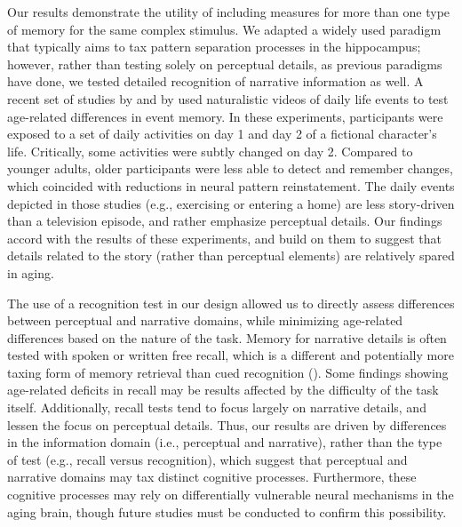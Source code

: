 \documentclass[11pt]{article}
\begin{document}
Our results demonstrate the utility of including measures for more than one type of memory for the same complex stimulus. We adapted a widely used paradigm that typically aims to tax pattern separation processes in the hippocampus; however, rather than testing solely on perceptual details, as previous paradigms have done, we tested detailed recognition of narrative information as well. A recent set of studies by \cite{wahlheim_memory_2019} and by \cite{stawarczyk_aging_2020} used naturalistic videos of daily life events to test age-related differences in event memory. In these experiments, participants were exposed to a set of daily activities on day 1 and day 2 of a fictional character’s life. Critically, some activities were subtly changed on day 2. Compared to younger adults, older participants were less able to detect and remember changes, which coincided with reductions in neural pattern reinstatement. The daily events depicted in those studies (e.g., exercising or entering a home) are less story-driven than a television episode, and rather emphasize perceptual details. Our findings accord with the results of these experiments, and build on them to suggest that details related to the story (rather than perceptual elements) are relatively spared in aging. 

The use of a recognition test in our design allowed us to directly assess differences between perceptual and narrative domains, while minimizing age-related differences based on the nature of the task. Memory for narrative details is often tested with spoken or written free recall, which is a different and potentially more taxing form of memory retrieval than cued recognition (\cite{craik_age_nodate}). Some findings showing age-related deficits in recall may be results affected by the difficulty of the task itself. Additionally, recall tests tend to focus largely on narrative details, and lessen the focus on perceptual details. Thus, our results are driven by differences in the information domain (i.e., perceptual and narrative), rather than the type of test (e.g., recall versus recognition), which suggest that perceptual and narrative domains may tax distinct cognitive processes. Furthermore, these cognitive processes may rely on differentially vulnerable neural mechanisms in the aging brain, though future studies must be conducted to confirm this possibility. 	 
\end{document}
